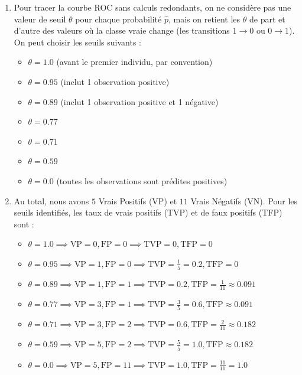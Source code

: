 \documentclass[]{../exercices}
\begin{document}
\begin{solution}
	\begin{enumerate}
		\item Pour tracer la courbe ROC sans calculs redondants, on ne considère pas une valeur de seuil $\theta$ pour chaque probabilité $\hat{p}$, mais on retient les $\theta$ de part et d'autre des valeurs où la classe vraie change (les transitions $1 \to 0$ ou $0 \to 1$).
		On peut choisir les seuils suivants :
		\begin{itemize}
			\item $\theta = 1.0$ (avant le premier individu, par convention)
			\item $\theta = 0.95$ (inclut 1 observation positive)
			\item $\theta = 0.89$ (inclut 1 observation positive et 1 négative)
			\item $\theta = 0.77$
			\item $\theta = 0.71$
			\item $\theta = 0.59$
			\item $\theta = 0.0$ (toutes les observations sont prédites positives)
		\end{itemize}

		\item Au total, nous avons $5$ Vrais Positifs (VP) et $11$ Vrais Négatifs (VN). Pour les seuils identifiés, les taux de vrais positifs (TVP) et de faux positifs (TFP) sont :
		\begin{itemize}
			\item $\theta = 1.0 \implies \text{VP} = 0, \text{FP} = 0 \implies \text{TVP} = 0, \text{TFP} = 0$
			\item $\theta = 0.95 \implies \text{VP} = 1, \text{FP} = 0 \implies \text{TVP} = \frac{1}{5} = 0.2, \text{TFP} = 0$
			\item $\theta = 0.89 \implies \text{VP} = 1, \text{FP} = 1 \implies \text{TVP} = 0.2, \text{TFP} = \frac{1}{11} \approx 0.091$
			\item $\theta = 0.77 \implies \text{VP} = 3, \text{FP} = 1 \implies \text{TVP} = \frac{3}{5} = 0.6, \text{TFP} \approx 0.091$
			\item $\theta = 0.71 \implies \text{VP} = 3, \text{FP} = 2 \implies \text{TVP} = 0.6, \text{TFP} = \frac{2}{11} \approx 0.182$
			\item $\theta = 0.59 \implies \text{VP} = 5, \text{FP} = 2 \implies \text{TVP} = \frac{5}{5} = 1.0, \text{TFP} \approx 0.182$
			\item $\theta = 0.0 \implies \text{VP} = 5, \text{FP} = 11 \implies \text{TVP} = 1.0, \text{TFP} = \frac{11}{11} = 1.0$
		\end{itemize}


\end{enumerate}
\end{solution}
\end{document}
